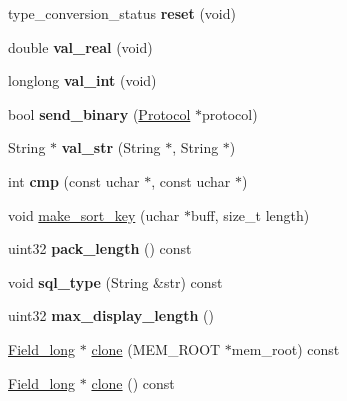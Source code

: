 \begin{DoxyCompactItemize}
type\+\_\+conversion\+\_\+status {\bfseries reset} (void)
\item 
\mbox{\label{classField__long_af2af483b5e30cf6238c1f7532a022cda}} 
double {\bfseries val\+\_\+real} (void)
\item 
\mbox{\label{classField__long_a90e83c7c99aeb1e2474f6bcbaab9850f}} 
longlong {\bfseries val\+\_\+int} (void)
\item 
\mbox{\label{classField__long_a21dcee6d2e9788188493b3be3d25fc9a}} 
bool {\bfseries send\+\_\+binary} (\mbox{\hyperlink{classProtocol}{Protocol}} $\ast$protocol)
\item 
\mbox{\label{classField__long_acd71c1b2f5bb1e3bd5410a90c5c7436d}} 
String $\ast$ {\bfseries val\+\_\+str} (String $\ast$, String $\ast$)
\item 
\mbox{\label{classField__long_a374ed991e0369e8e504ef0cc3a8af1fe}} 
int {\bfseries cmp} (const uchar $\ast$, const uchar $\ast$)
\item 
void \mbox{\hyperlink{classField__long_a21a8a887e6a4adf89c90523d89a0fd02}{make\+\_\+sort\+\_\+key}} (uchar $\ast$buff, size\+\_\+t length)
\item 
\mbox{\label{classField__long_a4bd686dc5d9531e672619a146be6602a}} 
uint32 {\bfseries pack\+\_\+length} () const
\item 
\mbox{\label{classField__long_a28bc733564eea438207ae9b743fd4c4d}} 
void {\bfseries sql\+\_\+type} (String \&str) const
\item 
\mbox{\label{classField__long_addc2166b1f9b3e413d0be4c995411945}} 
uint32 {\bfseries max\+\_\+display\+\_\+length} ()
\item 
\mbox{\hyperlink{classField__long}{Field\+\_\+long}} $\ast$ \mbox{\hyperlink{classField__long_aa05a09ef26e05bb90e4b032c33a3aa52}{clone}} (M\+E\+M\+\_\+\+R\+O\+OT $\ast$mem\+\_\+root) const
\item 
\mbox{\hyperlink{classField__long}{Field\+\_\+long}} $\ast$ \mbox{\hyperlink{classField__long_abe103218b320425eb87e4778641f4358}{clone}} () const
\item 
\mbox{\label{classField__long_a31c76b3029c01ded59c8121a4bc74dec}} 

\end{DoxyCompactItemize}
